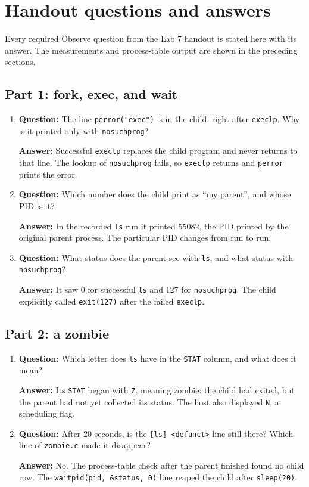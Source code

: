 \documentclass[12pt]{article}
\begin{document}
\clearpage
\section{Handout questions and answers}
Every required Observe question from the Lab 7 handout is stated here with its
answer. The measurements and process-table output are shown in the preceding sections.

\subsection{Part 1: fork, exec, and wait}
\begin{enumerate}
\item \textbf{Question:} The line \texttt{perror("exec")} is in the child, right after \texttt{execlp}. Why is it printed only with \texttt{nosuchprog}?
\par\textbf{Answer:} Successful \texttt{execlp} replaces the child program and never returns to that line. The lookup of \texttt{nosuchprog} fails, so \texttt{execlp} returns and \texttt{perror} prints the error.

\item \textbf{Question:} Which number does the child print as ``my parent'', and whose PID is it?
\par\textbf{Answer:} In the recorded \texttt{ls} run it printed 55082, the PID printed by the original parent process. The particular PID changes from run to run.

\item \textbf{Question:} What status does the parent see with \texttt{ls}, and what status with \texttt{nosuchprog}?
\par\textbf{Answer:} It saw 0 for successful \texttt{ls} and 127 for \texttt{nosuchprog}. The child explicitly called \texttt{exit(127)} after the failed \texttt{execlp}.
\end{enumerate}

\subsection{Part 2: a zombie}
\begin{enumerate}
\item \textbf{Question:} Which letter does \texttt{ls} have in the \texttt{STAT} column, and what does it mean?
\par\textbf{Answer:} Its \texttt{STAT} began with \texttt{Z}, meaning zombie: the child had exited, but the parent had not yet collected its status. The host also displayed \texttt{N}, a scheduling flag.

\item \textbf{Question:} After 20 seconds, is the \texttt{[ls] <defunct>} line still there? Which line of \texttt{zombie.c} made it disappear?
\par\textbf{Answer:} No. The process-table check after the parent finished found no child row. The \texttt{waitpid(pid, \&status, 0)} line reaped the child after \texttt{sleep(20)}.
\end{enumerate}
\end{document}
